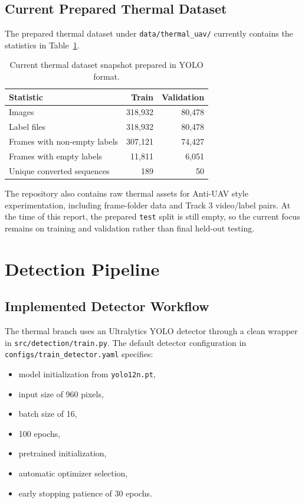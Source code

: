 \documentclass[10pt,conference]{IEEEtran}
\begin{document}
\subsection{Current Prepared Thermal Dataset}
The prepared thermal dataset under \texttt{data/thermal\_uav/} currently contains the statistics in Table~\ref{tab:dataset}.

\begin{table}[t]
\centering
\caption{Current thermal dataset snapshot prepared in YOLO format.}
\label{tab:dataset}
\begin{tabular}{lrr}
\toprule
\textbf{Statistic} & \textbf{Train} & \textbf{Validation} \\
\midrule
Images & 318,932 & 80,478 \\
Label files & 318,932 & 80,478 \\
Frames with non-empty labels & 307,121 & 74,427 \\
Frames with empty labels & 11,811 & 6,051 \\
Unique converted sequences & 189 & 50 \\
\bottomrule
\end{tabular}
\end{table}

The repository also contains raw thermal assets for Anti-UAV style experimentation, including frame-folder data and Track 3 video/label pairs. At the time of this report, the prepared \texttt{test} split is still empty, so the current focus remains on training and validation rather than final held-out testing.

\section{Detection Pipeline}
\subsection{Implemented Detector Workflow}
The thermal branch uses an Ultralytics YOLO detector through a clean wrapper in \texttt{src/detection/train.py}. The default detector configuration in \texttt{configs/train\_detector.yaml} specifies:

\begin{itemize}[leftmargin=1.5em]
    \item model initialization from \texttt{yolo12n.pt},
    \item input size of 960 pixels,
    \item batch size of 16,
    \item 100 epochs,
    \item pretrained initialization,
    \item automatic optimizer selection,
    \item early stopping patience of 30 epochs.
\end{itemize}
\end{document}
